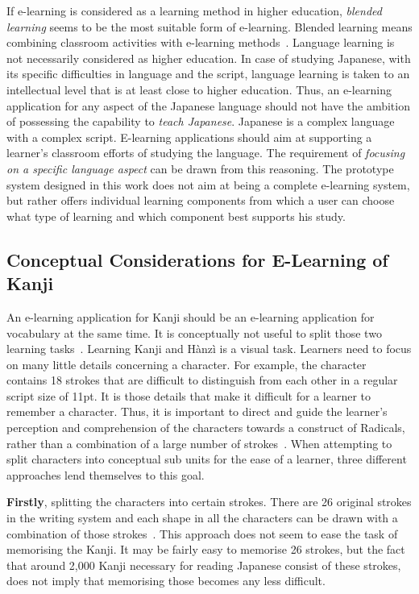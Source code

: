 If e-learning is considered as a learning method in higher education, 
\emph{blended learning} seems to be the most suitable form of e-learning.
Blended learning means combining classroom activities with e-learning 
methods~. Language learning is not 
necessarily considered as higher education. In case of studying Japanese,
with its specific difficulties in language and the script, language learning
is taken to an intellectual level that is at least close to higher education.
Thus, an e-learning application for any aspect of the Japanese language 
should not have the ambition of possessing the capability 
to \emph{teach Japanese}. Japanese is a complex language with a complex script.
E-learning applications should aim at supporting a learner's 
classroom efforts of studying the language. The requirement of 
\emph{focusing on a specific language aspect} can be drawn from this reasoning.
The prototype system designed in this work does not aim at being a complete
e-learning system, but rather offers individual learning components from which 
a user can choose what type of learning and which component best supports his 
study.

\subsection{Conceptual Considerations for E-Learning of Kanji}
\label{sec:concept:conceptualconsiderationsforelearningofKanji}

An e-learning application for Kanji should be an e-learning application for
vocabulary at the same time. It is conceptually not useful to split those two 
learning tasks~.
Learning Kanji and Hànzì is a visual task. Learners need to focus on many little
details concerning a character. For example, the character~ contains 18 
strokes that are difficult to distinguish from each other in a regular script 
size of 11pt. It is those details that make it difficult for a learner to 
remember a character. Thus, it is important to direct and guide the learner's 
perception and comprehension of the characters towards a construct of Radicals, 
rather than a combination of a large number of strokes~.
When attempting to split characters into conceptual sub units for the ease of
a learner, three different approaches lend themselves to this goal.

\textbf{Firstly}, splitting the characters into certain strokes. There are 26 
original strokes in the writing system and each shape in all the characters can 
be drawn with a combination of those strokes~.
This approach does not seem to ease the task of memorising the Kanji.
It may be fairly easy to memorise 26 strokes, but the fact that around 
2,000 Kanji necessary for reading Japanese consist of these strokes, does not
imply that memorising those becomes any less difficult.

